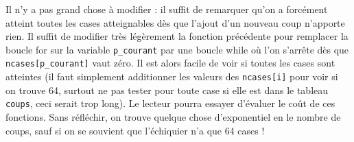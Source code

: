 

\Q
Il n'y a pas grand chose à modifier : il suffit de remarquer qu'on a forcément atteint toutes les cases atteignables dès que l'ajout d'un nouveau coup n'apporte rien. Il suffit de modifier très légèrement la fonction précédente pour remplacer la boucle \og for \fg{} sur la variable \texttt{p\_courant} par une boucle \og while \fg{} où l'on s'arrête dès que \texttt{ncases[p\_courant]} vaut zéro. Il est alors facile de voir si toutes les cases sont atteintes (il faut simplement additionner les valeurs des \texttt{ncases[i]} pour voir si on trouve 64, surtout ne pas tester pour toute case si elle est dans le tableau \texttt{coups}, ceci serait trop long). Le lecteur pourra essayer d'évaluer le coût de ces fonctions. Sans réfléchir, on trouve quelque chose d'exponentiel en le nombre de coups, sauf si on se souvient que l'échiquier n'a que 64 cases !

\Fin
